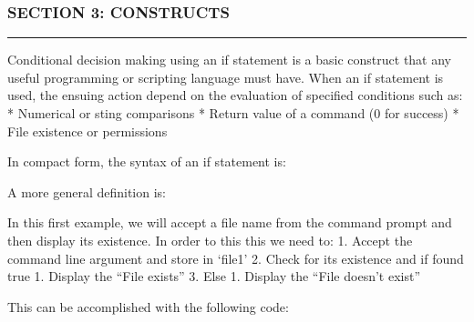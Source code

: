 \subsubsection{SECTION 3: CONSTRUCTS}\label{section-3-constructs}

\begin{center}\rule{3in}{0.4pt}\end{center}

Conditional decision making using an if statement is a basic construct
that any useful programming or scripting language must have. When an if
statement is used, the ensuing action depend on the evaluation of
specified conditions such as: * Numerical or sting comparisons * Return
value of a command (0 for success) * File existence or permissions

In compact form, the syntax of an if statement is:

\begin{Shaded}
\begin{Highlighting}[]
    
\end{Highlighting}
\end{Shaded}

A more general definition is:

\begin{Shaded}
\begin{Highlighting}[]
 
\end{Highlighting}
\end{Shaded}

In this first example, we will accept a file name from the command
prompt and then display its existence. In order to this this we need to:
1. Accept the command line argument and store in `file1' 2. Check for
its existence and if found true 1. Display the ``File exists'' 3. Else
1. Display the ``File doesn't exist''

This can be accomplished with the following code:

\begin{Shaded}
\begin{Highlighting}[]
\KeywordTok{if [}  \KeywordTok{ ]}
   
   
\end{Highlighting}
\end{Shaded}

